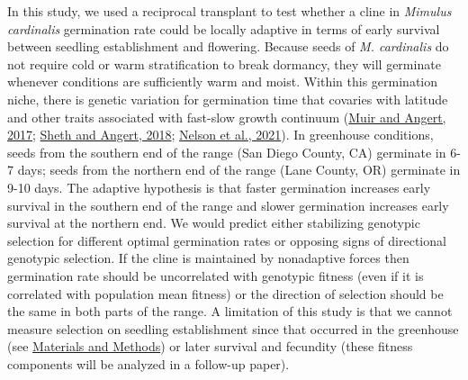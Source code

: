 \documentclass[
  12pt,
]{article}
\begin{document}
In this study, we used a reciprocal transplant to test whether a cline in \emph{Mimulus cardinalis} germination rate could be locally adaptive in terms of early survival between seedling establishment and flowering. Because seeds of \emph{M. cardinalis} do not require cold or warm stratification to break dormancy, they will germinate whenever conditions are sufficiently warm and moist. Within this germination niche, there is genetic variation for germination time that covaries with latitude and other traits associated with fast-slow growth continuum (\protect\hyperlink{ref-muir_grow_2017}{Muir and Angert, 2017}; \protect\hyperlink{ref-sheth_demographic_2018}{Sheth and Angert, 2018}; \protect\hyperlink{ref-nelson_quantitative_2021}{Nelson et al., 2021}). In greenhouse conditions, seeds from the southern end of the range (San Diego County, CA) germinate in 6-7 days; seeds from the northern end of the range (Lane County, OR) germinate in 9-10 days. The adaptive hypothesis is that faster germination increases early survival in the southern end of the range and slower germination increases early survival at the northern end. We would predict either stabilizing genotypic selection for different optimal germination rates or opposing signs of directional genotypic selection. If the cline is maintained by nonadaptive forces then germination rate should be uncorrelated with genotypic fitness (even if it is correlated with population mean fitness) or the direction of selection should be the same in both parts of the range. A limitation of this study is that we cannot measure selection on seedling establishment since that occurred in the greenhouse (see \protect\hyperlink{materials-and-methods}{Materials and Methods}) or later survival and fecundity (these fitness components will be analyzed in a follow-up paper).
\end{document}
